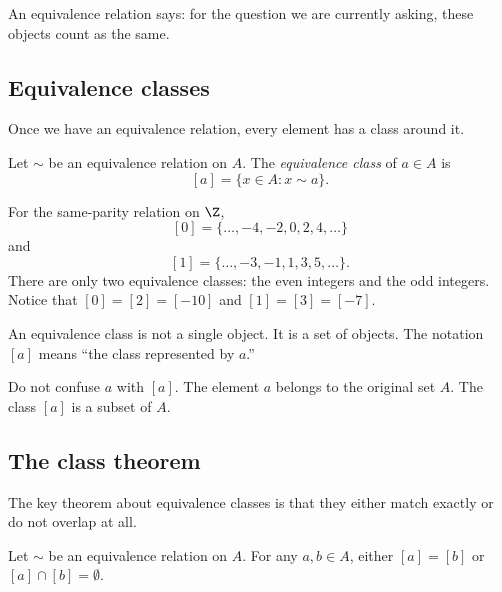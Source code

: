 \begin{intuitionbox}
An equivalence relation says: for the question we are currently asking, these objects count as the same.
\end{intuitionbox}

\subsection{Equivalence classes}

Once we have an equivalence relation, every element has a class around it.

\begin{definition}
Let $\sim$ be an equivalence relation on $A$. The \emph{equivalence class} of $a\in A$ is
\[
[a]=\{x\in A:x\sim a\}.
\]
\end{definition}

For the same-parity relation on $\Z$,
\[
[0]=\{\ldots,-4,-2,0,2,4,\ldots\}
\]
and
\[
[1]=\{\ldots,-3,-1,1,3,5,\ldots\}.
\]
There are only two equivalence classes: the even integers and the odd integers. Notice that $[0]=[2]=[-10]$ and $[1]=[3]=[-7]$.

An equivalence class is not a single object. It is a set of objects. The notation $[a]$ means ``the class represented by $a$.''

\begin{trapbox}
Do not confuse $a$ with $[a]$. The element $a$ belongs to the original set $A$. The class $[a]$ is a subset of $A$.
\end{trapbox}

\subsection{The class theorem}

The key theorem about equivalence classes is that they either match exactly or do not overlap at all.

\begin{theorem}
Let $\sim$ be an equivalence relation on $A$. For any $a,b\in A$, either $[a]=[b]$ or $[a]\cap[b]=\emptyset$.
\end{theorem}

